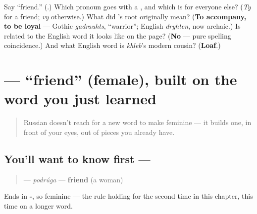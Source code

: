 \begin{tcolorbox}[breakable,colback=teal!4,colframe=teal!35!black,title={Before you move on}]
Say \textquotedblleft{}friend.\textquotedblright{} (\textbf{}.) Which pronoun goes with a \emph{}, and which is for everyone else? (\emph{Ty} for a friend; \emph{vy} otherwise.) What did \emph{}'s root originally mean? (\textbf{To accompany, to be loyal} — Gothic \emph{gadrauhts}, \textquotedblleft{}warrior\textquotedblright{}; English \emph{dryhten}, now archaic.) Is \emph{} related to the English word it looks like on the page? (\textbf{No} — pure spelling coincidence.) And what English word is \emph{khleb}'s modern cousin? (\textbf{Loaf}.)
\end{tcolorbox}
\section[\texorpdfstring{\ru{подруга} (podrúga)}{подруга (podrúga)}]{ — \textquotedblleft{}friend\textquotedblright{} (female), built on the word you just learned}

\label{lesson:RU-C07-podruga}



\begin{quote}
Russian doesn't reach for a new word to make \emph{} feminine — it builds one, in front of your eyes, out of pieces you already have.
\end{quote}

\subsection*{You'll want to know first — }
\begin{quote}
\textbf{} — \emph{podrúga} — \textbf{friend} (a woman)
\end{quote}

Ends in \textbf{-}, so feminine — the rule holding for the second time in this chapter, this time on a longer word.

